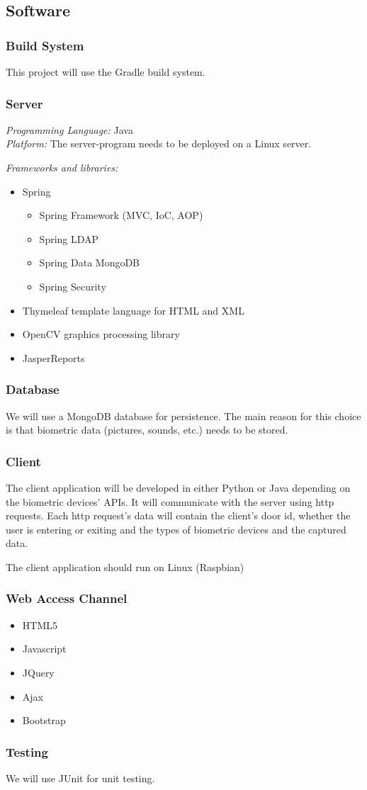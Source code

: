 \subsection{Software}

\subsubsection{Build System}
This project will use the Gradle build system.

\subsubsection{Server}
\textit{Programming Language:} Java \\
\textit{Platform:} The server-program needs to be deployed on a Linux server.

\textit{Frameworks and libraries:}
\begin{itemize}
	\item Spring
		\begin{itemize}
			\item Spring Framework (MVC, IoC, AOP)
			\item Spring LDAP
			\item Spring Data MongoDB
			\item Spring Security
		\end{itemize}
	\item Thymeleaf template language for HTML and XML
	\item OpenCV graphics processing library
	\item JasperReports
\end{itemize}

\subsubsection{Database}
We will use a MongoDB database for persistence. The main reason for this choice is that biometric data (pictures, sounds, etc.) needs to be stored.

\subsubsection{Client}
The client application will be developed in either Python or Java depending on the biometric devices' APIs. It will communicate with the server using http requests. Each http request's data will contain the client's door id, whether the user is entering or exiting and the types of biometric devices and the captured data. 

The client application should run on Linux (Raspbian)

\subsubsection{Web Access Channel}
\begin{itemize}
	\item HTML5
	\item Javascript
	\item JQuery
	\item Ajax
	\item Bootstrap
\end{itemize}

\subsubsection{Testing}
We will use JUnit for unit testing.